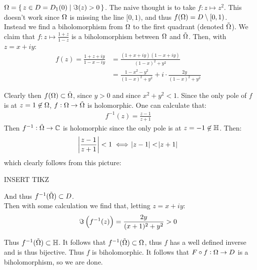 \begin{example}
$\Omega = \set{ z \in D = D_1(0) \mid \Im(z) > 0}$. The naive thought is to take $f:z \mapsto z^2$. This doesn't work since $\Omega$ is missing the line $[0,1)$, and thus $f(\Omega) = D \setminus [0,1)$.\\

Instead we find a biholomorphism from $\Omega$ to the first quadrant (denoted $\Tilde{\Omega}$). We claim that $f: z \mapsto \frac{1+z}{1-z}$ is a biholomorphism between $\Omega$ and $\Tilde{\Omega}$. Then, with $z = x + iy$:
\begin{align*}
    f(z) = \frac{1+z+iy}{1-x-iy} &= \frac{(1+x+iy)(1-x+iy)}{(1-x)^2 + y^2}\\
    &= \frac{1-x^2-y^2}{(1-x)^2 + y^2} + i \cdot \frac{2y}{(1-x)^2 + y^2}
\end{align*}


Clearly then $f(\Omega) \subset \Tilde{\Omega}$, since $y >0$ and since $x^2+y^2 <1$. Since the only pole of $f$ is at $z=1 \not\in \Omega$, $f: \Omega \to \Tilde{\Omega}$ is holomorphic. One can calculate that:
\begin{align*}
    f^{-1}(z) = \frac{z-1}{z+1}
\end{align*}
Then $f^{-1}: \Tilde{\Omega} \to \mathbb{C}$ is holomorphic since the only pole is at $z=-1 \not\in \mathbb{H}$. Then:
\begin{align*}
    \abs{\frac{z-1}{z+1}} < 1 \iff \abs{z-1} < \abs{z+1}
\end{align*}
which clearly follows from this picture:

INSERT TIKZ

And thus $f^{-1} (\Tilde{\Omega}) \subset D$.\\

Then with some calculation we find that, letting $z=x+iy$:
\begin{align*}
    \Im \left( f^{-1}(z) \right) = \frac{2y}{(x+1)^2 + y^2} > 0
\end{align*}

Thus $f^{-1} (\Tilde{\Omega}) \subset \mathbb{H}$. It follows that $f^{-1} (\Tilde{\Omega}) \subset \Omega$, thus $f$ has a well defined inverse and is thus bijective. Thus $f$ is biholomorphic. It follows that $F \circ f :\Omega \to D$ is a biholomorphism, so we are done.
\end{example}

